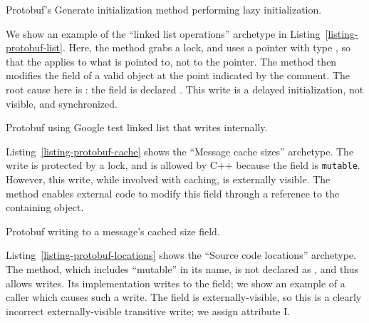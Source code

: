 \begin{listing}[!htb]
  \caption{Protobuf's Generate initialization method performing lazy initialization.}
  \label{listing-protobuf-generator-lazy}
  \centering
  
\end{listing}

We show an example of the ``linked list operations'' archetype in
Listing~\ref{listing-protobuf-list}.
Here, the  method grabs a lock, and uses a pointer with type
, so that the \const{} applies to what is
pointed to, not to the pointer.
The method then modifies the  field of a valid object at the point
indicated by the comment.
The root cause here is : the  field is declared
.
This write is a delayed initialization, not visible, and synchronized.

\begin{listing}[!htb]
  \caption{Protobuf using Google test linked list that writes internally.}
  \label{listing-protobuf-list}
  \centering
  
\end{listing}

Listing~\ref{listing-protobuf-cache} shows the ``Message cache
sizes'' archetype.
The write is protected by a lock, and is allowed by C++ because the field is
\texttt{mutable}.
However, this write, while involved with caching, is externally visible.
The method  enables
external code to modify this field through a \const{}
reference to the containing object.

\begin{listing}[!htb]
  \setlength{\belowcaptionskip}{-1em}
  \caption{Protobuf writing to a message's cached size field.}
  \label{listing-protobuf-cache}
  \centering
  
\end{listing}

Listing~\ref{listing-protobuf-locations} shows the ``Source code locations''
archetype.
The  method, which includes ``mutable'' in its
name, is not declared as \const{}, and thus allows writes.
Its implementation writes to the  field; we show an example of
a caller which causes such a write.
The  field is externally-visible, so this is a clearly
incorrect externally-visible transitive write; we assign attribute I.

